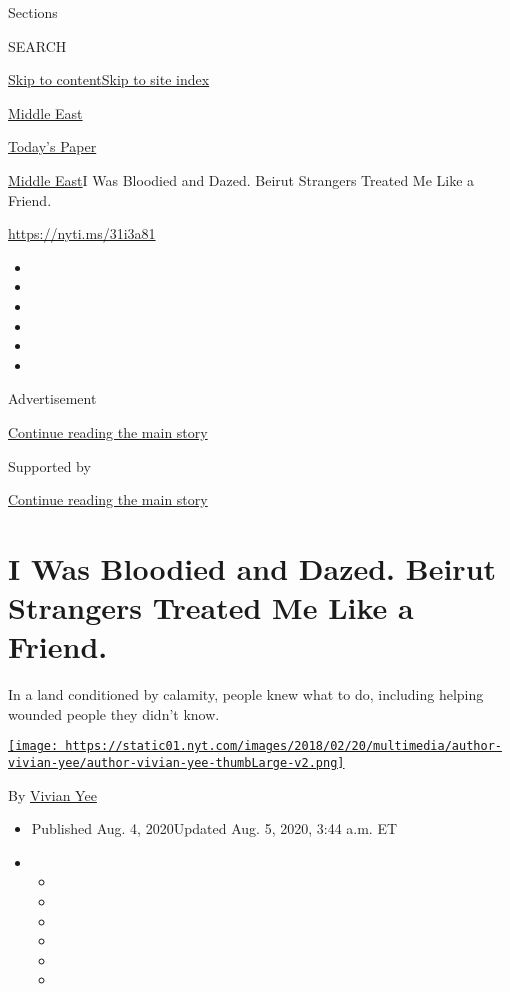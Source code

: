 Sections

SEARCH

\protect\hyperlink{site-content}{Skip to
content}\protect\hyperlink{site-index}{Skip to site index}

\href{https://www.nytimes.com/section/world/middleeast}{Middle East}

\href{https://myaccount.nytimes.com/auth/login?response_type=cookie\&client_id=vi}{}

\href{https://www.nytimes.com/section/todayspaper}{Today's Paper}

\href{/section/world/middleeast}{Middle East}\textbar{}I Was Bloodied
and Dazed. Beirut Strangers Treated Me Like a Friend.

\url{https://nyti.ms/31i3a81}

\begin{itemize}
\item
\item
\item
\item
\item
\item
\end{itemize}

Advertisement

\protect\hyperlink{after-top}{Continue reading the main story}

Supported by

\protect\hyperlink{after-sponsor}{Continue reading the main story}

\hypertarget{i-was-bloodied-and-dazed-beirut-strangers-treated-me-like-a-friend}{%
\section{I Was Bloodied and Dazed. Beirut Strangers Treated Me Like a
Friend.}\label{i-was-bloodied-and-dazed-beirut-strangers-treated-me-like-a-friend}}

In a land conditioned by calamity, people knew what to do, including
helping wounded people they didn't know.

\href{https://www.nytimes.com/by/vivian-yee}{\texttt{[image: https://static01.nyt.com/images/2018/02/20/multimedia/author-vivian-yee/author-vivian-yee-thumbLarge-v2.png]}}

By \href{https://www.nytimes.com/by/vivian-yee}{Vivian Yee}

\begin{itemize}
\item
  Published Aug. 4, 2020Updated Aug. 5, 2020, 3:44 a.m. ET
\item
  \begin{itemize}
  \item
  \item
  \item
  \item
  \item
  \item
  \end{itemize}
\end{itemize}

